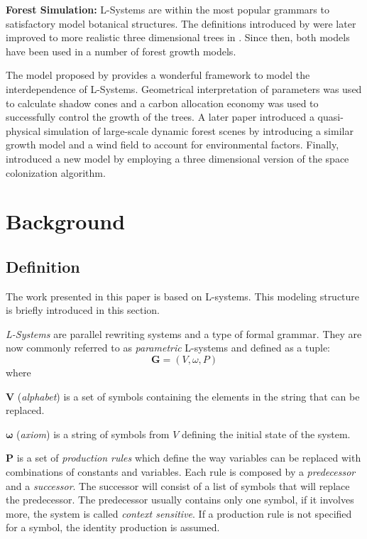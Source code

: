 \documentclass[letterpaper,twoside,11pt]{article}
\begin{document}
\begin{multicols}{2}
\textbf{Forest Simulation:} L-Systems are within the most popular grammars to satisfactory model botanical structures. The definitions introduced by \cite{Prusinkiewicz:1996:ABP:235579} were later improved to more realistic three dimensional trees in \cite{4055766}. Since then, both models have been used in a number of forest growth models.

The model proposed by \cite{KurthSloboda2002} provides a wonderful framework to model the interdependence of L-Systems. Geometrical interpretation of parameters was used to calculate shadow cones and a carbon allocation economy was used to successfully control the growth of the trees. A later paper introduced a quasi-physical simulation of large-scale dynamic forest scenes by introducing a similar growth model and a wind field to account for environmental factors. Finally, \cite{Runions07modelingtrees} introduced a new model by employing a three dimensional version of the space colonization algorithm.


\section{Background} %
\label{sec:background}

\subsection{Definition} %
\label{sub:definition}

The work presented in this paper is based on L-systems. This modeling structure is briefly introduced in this section.

\emph{L-Systems} are parallel rewriting systems and a type of formal grammar. They are now commonly referred to as \emph{parametric} L-systems and defined as a tuple:
\begin{equation}
	\textbf{G} = (V, \omega, P)
\end{equation}
where
\begin{compactitem}
\item $\textbf{V}$ (\emph{alphabet}) is a set of symbols containing the elements in the string that can be replaced.
\item $\boldsymbol\omega$ (\emph{axiom}) is a string of symbols from $V$ defining the initial state of the system.
\item $\textbf{P}$ is a set of \emph{production rules} which define the way variables can be replaced with combinations of constants and variables. Each rule is composed by a \emph{predecessor} and a \emph{successor}. The successor will consist of a list of symbols that will replace the predecessor. The predecessor usually contains only one symbol, if it involves more, the system is called \emph{context sensitive}. If a production rule is not specified for a symbol, the identity production is assumed.
\end{compactitem}


\end{multicols}
\end{document}
